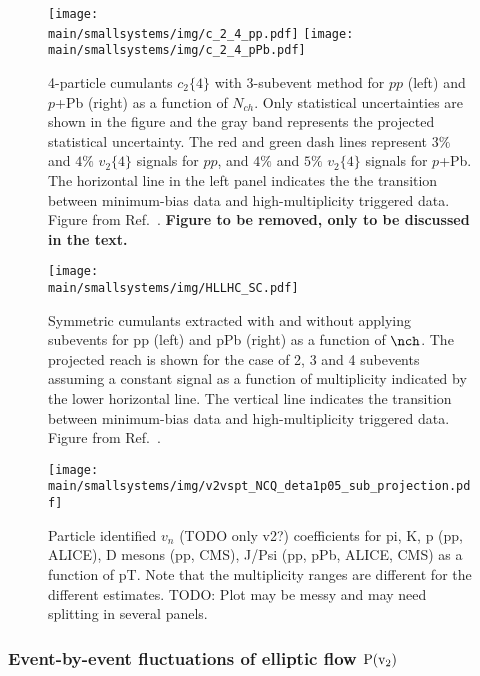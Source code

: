 \documentclass[../report.tex]{subfiles}
\providecommand{\main}{..}
\begin{document}
\begin{figure}[ht]
\centering
\texttt{[image: \\main/smallsystems/img/c\_2\_4\_pp.pdf]}
\texttt{[image: \\main/smallsystems/img/c\_2\_4\_pPb.pdf]}
\caption{4-particle cumulants $c_2\{4\}$ with 3-subevent method for $pp$ (left) and $p$+Pb (right) as a function of $N_{ch}$. Only statistical uncertainties are shown in the figure and the gray band represents the projected statistical uncertainty. The red and green dash lines represent $3\%$ and $4\%$ $v_2\{4\}$ signals for $pp$, and $4\%$ and $5\%$ $v_2\{4\}$ signals for $p$+Pb. The horizontal line in the left panel indicates the the transition between minimum-bias data and high-multiplicity triggered data. Figure from Ref.~\cite{}. {\bf Figure to be removed, only to be discussed in the text.}}
\label{fig:smallsystems_corr_cumulants_v2}
\end{figure}

\begin{figure}[ht]
\centering
\texttt{[image: \\main/smallsystems/img/HLLHC\_SC.pdf]}
\caption{Symmetric cumulants extracted with and without applying subevents for pp (left) and pPb (right) as a function of $\nch$. The projected reach is shown for the case of 2, 3 and 4 subevents assuming a constant signal as a function of multiplicity indicated by the lower horizontal line. The vertical line indicates the transition between minimum-bias data and high-multiplicity triggered data. Figure from Ref.~\cite{}.}
\label{fig:smallsystems_corr_symmetriccumulants}
\end{figure}

\begin{figure}[ht]
\centering
\texttt{[image: \\main/smallsystems/img/v2vspt\_NCQ\_deta1p05\_sub\_projection.pdf]}

\caption{Particle identified $v_n$ (TODO only v2?) coefficients for pi, K, p (pp, ALICE), D mesons (pp, CMS), J/Psi (pp, pPb, ALICE, CMS) as a function of pT. Note that the multiplicity ranges are different for the different estimates. TODO: Plot may be messy and may need splitting in several panels.}
\label{fig:smallsystems_corr_cumulants_pid}
\end{figure}

\subsubsection{Event-by-event fluctuations of elliptic flow $\rm{P}(v_{2})$}
\end{document}
